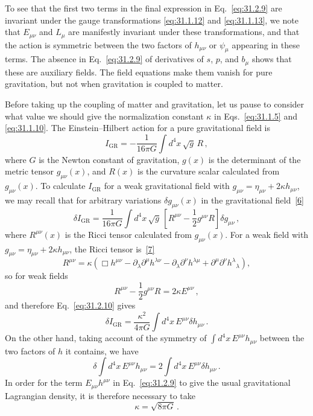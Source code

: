 To see that the first two terms in the final expression in
Eq.~\eqref{eq:31.2.9} are invariant under the gauge transformations
\eqref{eq:31.1.12} and \eqref{eq:31.1.13}, we note that \(E_{\mu\nu}\) and
\(L_\mu\) are manifestly invariant under these transformations, and that the
action is symmetric between the two factors of \(h_{\mu\nu}\) or \(\psi_\mu\)
appearing in these terms. The absence in Eq.~\eqref{eq:31.2.9} of derivatives
of \(s\), \(p\), and \(b_\mu\) shows that these are auxiliary fields. The field
equations make them vanish for pure gravitation, but not when gravitation is
coupled to matter.

Before taking up the coupling of matter and gravitation, let us pause to
consider what value we should give the normalization constant \(\kappa\) in
Eqs.~\eqref{eq:31.1.5} and \eqref{eq:31.1.10}. The Einstein--Hilbert action
for a pure gravitational field is
\begin{equation}
  I_{\mathrm{GR}}
  =-\frac{1}{16\pi G}\int d^4x\,\sqrt{g}\,R\,,
  \tag{31.2.10}\label{eq:31.2.10}
\end{equation}
where \(G\) is the Newton constant of gravitation, \(g(x)\) is the determinant
of the metric tensor \(g_{\mu\nu}(x)\), and \(R(x)\) is the curvature scalar
calculated from \(g_{\mu\nu}(x)\). To calculate \(I_{\mathrm{GR}}\) for a weak
gravitational field with
\(g_{\mu\nu}=\eta_{\mu\nu}+2\kappa h_{\mu\nu}\), we may recall that for
arbitrary variations \(\delta g_{\mu\nu}(x)\) in the gravitational
field~\hyperref[ch31-ref-6]{[6]}
\begin{equation}
  \delta I_{\mathrm{GR}}
  =\frac{1}{16\pi G}\int d^4x\,\sqrt{g}\,
   \left[R^{\mu\nu}-\frac12g^{\mu\nu}R\right]\delta g_{\mu\nu}\,,
  \tag{31.2.11}\label{eq:31.2.11}
\end{equation}
where \(R^{\mu\nu}(x)\) is the Ricci tensor calculated from
\(g_{\mu\nu}(x)\). For a weak field with
\(g_{\mu\nu}=\eta_{\mu\nu}+2\kappa h_{\mu\nu}\), the Ricci tensor
is~\hyperref[ch31-ref-7]{[7]}
\begin{equation}
  R^{\mu\nu}
  =\kappa\left(
     \Box h^{\mu\nu}
     -\partial_\lambda\partial^\mu h^{\lambda\nu}
     -\partial_\lambda\partial^\nu h^{\lambda\mu}
     +\partial^\mu\partial^\nu h^\lambda{}_\lambda
   \right),
  \tag{31.2.12}\label{eq:31.2.12}
\end{equation}
so for weak fields
\begin{equation}
  R^{\mu\nu}-\frac12g^{\mu\nu}R=2\kappa E^{\mu\nu}\,,
  \tag{31.2.13}\label{eq:31.2.13}
\end{equation}
and therefore Eq.~\eqref{eq:31.2.10} gives
\[
  \delta I_{\mathrm{GR}}
  =\frac{\kappa^2}{4\pi G}
   \int d^4x\,E^{\mu\nu}\delta h_{\mu\nu}\,.
\]
On the other hand, taking account of the symmetry of
\(\int d^4x\,E^{\mu\nu}h_{\mu\nu}\) between the two factors of \(h\) it
contains, we have
\[
  \delta\int d^4x\,E^{\mu\nu}h_{\mu\nu}
  =2\int d^4x\,E^{\mu\nu}\delta h_{\mu\nu}\,.
\]
In order for the term \(E_{\mu\nu}h^{\mu\nu}\) in
Eq.~\eqref{eq:31.2.9} to give the usual gravitational Lagrangian density, it
is therefore necessary to take
\begin{equation}
  \kappa=\sqrt{8\pi G}\,.
  \tag{31.2.14}\label{eq:31.2.14}
\end{equation}

